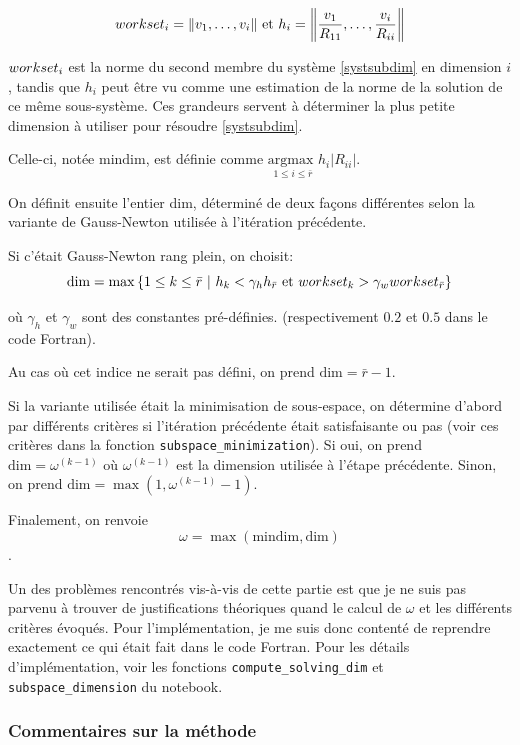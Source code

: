 \documentclass[a4paper,11pt]{article}
\numberwithin{equation}{section}
\begin{document}
 $$workset_{i} = \|v_{1},\ldots, v_{i}\| \text{ et } h_{i}=\left \|\frac{v_{1}}{R_{11}},\ldots,\frac{v_{i}}{R_{ii}} \right \|$$
 
 $workset_{i}$ est la norme du second membre du système \ref{systsubdim} en dimension $i$, tandis que $h_{i}$ peut être vu comme une estimation de la norme de la solution de ce même sous-système. Ces grandeurs servent à déterminer la plus petite dimension à utiliser pour résoudre \ref{systsubdim}.
 
 Celle-ci, notée $\text{mindim}$, est définie comme $\underset{1\leq i \leq \bar{r}}{\text{argmax }} h_{i}|R_{ii}|$.
 
On définit ensuite l'entier dim, déterminé de deux fa\c cons différentes selon la variante de Gauss-Newton utilisée à l'itération précédente.

Si c'était Gauss-Newton rang plein, on choisit:
$$
\text{dim}= \max \left\{ 1\leq k \leq \bar{r}\ | \ h_{k} < \gamma_{h}h_{\bar{r}} \text{ et } workset_{k} > \gamma_{w}workset_{\bar{r}} \right\}
$$

où $\gamma_{h}$ et $\gamma_{w}$ sont des constantes pré-définies. (respectivement $0.2$ et $0.5$ dans le code Fortran).

Au cas où cet indice ne serait pas défini, on prend $\text{dim}=\bar{r}-1$.

Si la variante utilisée était la minimisation de sous-espace, on détermine d'abord par différents critères si l'itération précédente était satisfaisante ou pas (voir ces critères dans la fonction \texttt{subspace\_minimization}). Si oui, on prend  $\text{dim}=\omega^{(k-1)}$ où $\omega^{(k-1)}$ est la dimension utilisée à l'étape précédente. Sinon, on prend $\text{dim}=\max(1,\omega^{(k-1)}-1)$.

Finalement, on renvoie
$$\omega = \max(\text{mindim},\text{dim})$$.
 
 
Un des problèmes rencontrés vis-à-vis de cette partie est que je ne suis pas parvenu à trouver de justifications théoriques quand le calcul de $\omega$ et les différents critères évoqués. Pour l'implémentation, je me suis donc contenté de reprendre exactement ce qui était fait dans le code Fortran. Pour les détails d'implémentation, voir les fonctions \texttt{compute\_solving\_dim} et \texttt{subspace\_dimension} du notebook.


\subsubsection{Commentaires sur la méthode}
\end{document}
